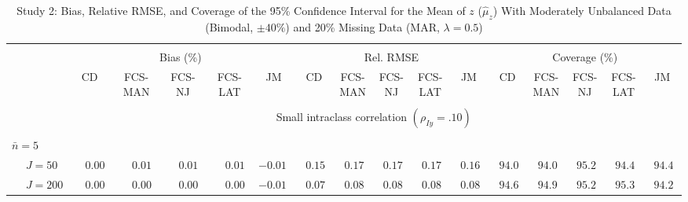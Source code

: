 \begin{sidewaystable}
\begin{threeparttable}
\setlength{\tabcolsep}{1.0pt}
\renewcommand{\arraystretch}{0.95}
\footnotesize
\caption{\small Study 2: Bias, Relative RMSE, and Coverage of the 95\% Confidence Interval for the Mean of $z$ ($\hat\mu_z$) With Moderately Unbalanced Data (Bimodal, $\pm 40\%$) and 20\% Missing Data (MAR, $\lambda=0.5$)}
\begin{tabular}{llccccccccccccccc}
\hline\\[-1.8ex]
& & \multicolumn{5}{c}{Bias (\%)} & \multicolumn{5}{c}{Rel. RMSE} & \multicolumn{5}{c}{Coverage (\%)} \\ \cmidrule(r){3-7}\cmidrule(r){8-12}\cmidrule(r){13-17}
 &  & CD & \makecell{FCS-\\MAN} & \makecell{FCS-\\NJ} & \makecell{FCS-\\LAT} & JM & CD & \makecell{FCS-\\MAN} & \makecell{FCS-\\NJ} & \makecell{FCS-\\LAT} & JM & CD & \makecell{FCS-\\MAN} & \makecell{FCS-\\NJ} & \makecell{FCS-\\LAT} & \multicolumn{1}{c}{JM} \\ 
[0.4ex]\hline\\[-1.8ex]
& & \multicolumn{15}{c}{Small intraclass correlation $(\rho_{Iy}=.10)$} \\[0.6ex]\hline\\[-1.8ex]
\multicolumn{4}{l}{$\bar{n}=5$} \\  & \nopagebreak $\;J=50$  & $\phantom{-}0.00\phantom{0}$ & $\phantom{-}0.01\phantom{0}$ & $\phantom{-}0.01\phantom{0}$ & $\phantom{-}0.01\phantom{0}$ & ${-}0.01\phantom{0}$ & $\phantom{0}0.15\phantom{0}$ & $\phantom{0}0.17\phantom{0}$ & $\phantom{0}0.17\phantom{0}$ & $\phantom{0}0.17\phantom{0}$ & $\phantom{0}0.16\phantom{0}$ & $\phantom{0}94.0\phantom{0}$ & $\phantom{0}94.0\phantom{0}$ & $\phantom{0}95.2\phantom{0}$ & $\phantom{0}94.4\phantom{0}$ & $\phantom{0}94.4\phantom{0}$ \\
 & \nopagebreak $\;J=200$  & $\phantom{-}0.00\phantom{0}$ & $\phantom{-}0.00\phantom{0}$ & $\phantom{-}0.00\phantom{0}$ & $\phantom{-}0.00\phantom{0}$ & ${-}0.01\phantom{0}$ & $\phantom{0}0.07\phantom{0}$ & $\phantom{0}0.08\phantom{0}$ & $\phantom{0}0.08\phantom{0}$ & $\phantom{0}0.08\phantom{0}$ & $\phantom{0}0.08\phantom{0}$ & $\phantom{0}94.6\phantom{0}$ & $\phantom{0}94.9\phantom{0}$ & $\phantom{0}95.2\phantom{0}$ & $\phantom{0}95.3\phantom{0}$ & $\phantom{0}94.2\phantom{0}$ \\

\end{tabular}
\end{threeparttable}
\end{sidewaystable}

